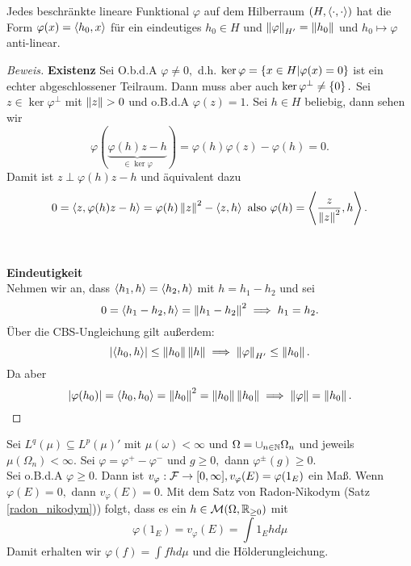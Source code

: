 
\begin{theorem}\label{riez1} Jedes beschränkte   lineare Funktional $\varphi$ auf dem Hilberraum $(H, \left\langle\cdot, \cdot\right\rangle)$ hat die Form $\varphi(x)= \left\langle h_0,x\right\rangle$ für ein eindeutiges $h_0 \in H$ und $\left\lVert\varphi\right\rVert_{H'} = \left\lVert h_0\right\rVert$ und $h_0 \mapsto \varphi$ anti-linear.

\begin{proof}[Beweis]
\textbf{Existenz}
Sei O.b.d.A $\varphi \not= 0,$ d.h. $\ker \varphi = \left\{x \in H | \varphi(x) = 0\right\}$ ist ein echter abgeschlossener Teilraum. Dann muss aber auch $\ker{\varphi^{\perp}} \not= \left\{0\right\}.$ Sei $z \in \ker{\varphi}^\perp$ mit $\left\lVert z\right\rVert>0$ und o.B.d.A $\varphi(z) = 1.$ Sei $h \in H$ beliebig, dann sehen wir \[ \varphi(\underbrace{\varphi(h)z-h}_{\in \ker\varphi }) = \varphi(h)\varphi(z)-\varphi(h) = 0.\] Damit ist $z \perp \varphi(h)z - h$ und äquivalent dazu \[0 = \left\langle z, \varphi(h)z-h\right\rangle = \varphi(h)\left\lVert z\right\rVert^2-\left\langle z,h\right\rangle \text{ also } \varphi(h) = \left\langle\frac{z}{\left\lVert z\right\rVert^2}, h\right\rangle.\] \\ \\\textbf{Eindeutigkeit} \\
Nehmen wir an, dass $\left\langle h_1, h\right\rangle = \left\langle h_2, h\right\rangle$ mit $h = h_1 - h_2$ und sei \[0 = \left\langle h_1 - h_2, h\right\rangle = \left\lVert h_1 - h_2\right\rVert^2 \implies h_1 = h_2.\] Über die CBS-Ungleichung gilt außerdem: \[\left\lvert \left\langle h_0, h\right\rangle \right\rvert \leq \left\lVert h_0\right\rVert\left\lVert h\right\rVert \implies \left\lVert\varphi\right\rVert_{H'} \leq \left\lVert h_0\right\rVert.\] Da aber \[\left\lvert \varphi(h_0) \right\rvert = \left\langle h_0, h_0\right\rangle = \left\lVert h_0\right\rVert^2 = \left\lVert h_0\right\rVert\left\lVert h_0\right\rVert \implies \left\lVert\varphi\right\rVert = \left\lVert h_0\right\rVert.\]
\end{proof}
\end{theorem}

\begin{ex}
Sei $L^q(\mu) \subseteq L^p(\mu)'$ mit $\mu(\omega) < \infty$ und $\Omega = \cup_{n \in \mathbb{N}} \Omega_n$ und jeweils $\mu(\Omega_n) < \infty.$ Sei $\varphi = \varphi^+ - \varphi^-$ und $g \geq 0,$ dann $\varphi^{\pm}(g) \geq 0.$ \\
Sei o.B.d.A $\varphi \geq 0.$ Dann ist $v_{\varphi}: \mathcal{F} \to [0, \infty], v_{\varphi}(E) = \varphi(1_E)$ ein Maß. Wenn $\varphi(E) = 0,$ dann $v_{\varphi}(E) = 0.$ Mit dem Satz von Radon-Nikodym (Satz \ref{radon_nikodym})) folgt, dass es ein $h \in \mathcal{M}(\Omega, \mathbb{R}_{\geq 0})$ mit \[\varphi(1_E) = v_{\varphi}(E) = \int1_E h d\mu\]
Damit erhalten wir $\varphi(f) = \int fhd\mu$ und die Hölderungleichung.
\end{ex}

